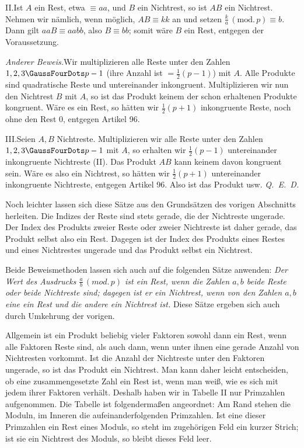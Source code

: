 II.\quad Ist $A$ ein Rest, etwa $\equiv aa$, und $B$ ein Nichtrest, so ist $AB$ ein Nichtrest. Nehmen wir nämlich, wenn möglich, $AB\equiv kk$ an und setzen $\frac{k}{a}\,(\mathrm{mod.}\,p)\equiv b$. Dann gilt $aaB\equiv aabb$, also $B\equiv bb$; somit wäre $B$ ein Rest, entgegen der Voraussetzung.

\emph{Anderer Beweis.}\quad Wir multiplizieren alle Reste unter den Zahlen $1,2,3\GaussFourDots p-1$ (ihre Anzahl ist $=\tfrac12(p-1)$) mit $A$. Alle Produkte sind quadratische Reste und untereinander inkongruent. Multiplizieren wir nun den Nichtrest $B$ mit $A$, so ist das Produkt keinem der schon erhaltenen Produkte kongruent. Wäre es ein Rest, so hätten wir $\tfrac12(p+1)$ inkongruente Reste, noch ohne den Rest $0$, entgegen Artikel 96.

III.\quad Seien $A,B$ Nichtreste. Multiplizieren wir alle Reste unter den Zahlen $1,2,3\GaussFourDots p-1$ mit $A$, so erhalten wir $\tfrac12(p-1)$ untereinander inkongruente Nichtreste (II). Das Produkt $AB$ kann keinem davon kongruent sein. Wäre es also ein Nichtrest, so hätten wir $\tfrac12(p+1)$ untereinander inkongruente Nichtreste, entgegen Artikel 96. Also ist das Produkt usw. \mbox{\emph{Q. E. D.}}

Noch leichter lassen sich diese Sätze aus den Grundsätzen des vorigen Abschnitts herleiten. Die Indizes der Reste sind stets gerade, die der Nichtreste ungerade. Der Index des Produkts zweier Reste oder zweier Nichtreste ist daher gerade, das Produkt selbst also ein Rest. Dagegen ist der Index des Produkts eines Restes und eines Nichtrestes ungerade und das Produkt selbst ein Nichtrest.

Beide Beweismethoden lassen sich auch auf die folgenden Sätze anwenden: \emph{Der Wert des Ausdrucks $\frac{a}{b}\,(\mathit{mod.}\,p)$ ist ein Rest, wenn die Zahlen $a,b$ beide Reste oder beide Nichtreste sind; dagegen ist er ein Nichtrest, wenn von den Zahlen $a,b$ eine ein Rest und die andere ein Nichtrest ist.} Diese Sätze ergeben sich auch durch Umkehrung der vorigen.

Allgemein ist ein Produkt beliebig vieler Faktoren sowohl dann ein Rest, wenn alle Faktoren Reste sind, als auch dann, wenn unter ihnen eine gerade Anzahl von Nichtresten vorkommt. Ist die Anzahl der Nichtreste unter den Faktoren ungerade, so ist das Produkt ein Nichtrest. Man kann daher leicht entscheiden, ob eine zusammengesetzte Zahl ein Rest ist, wenn man weiß, wie es sich mit jedem ihrer Faktoren verhält. Deshalb haben wir in Tabelle II nur Primzahlen aufgenommen. Die Tabelle ist folgendermaßen angeordnet: Am Rand stehen die Moduln, im Inneren die aufeinanderfolgenden Primzahlen. Ist eine dieser Primzahlen ein Rest eines Moduls, so steht im zugehörigen Feld ein kurzer Strich; ist sie ein Nichtrest des Moduls, so bleibt dieses Feld leer.

